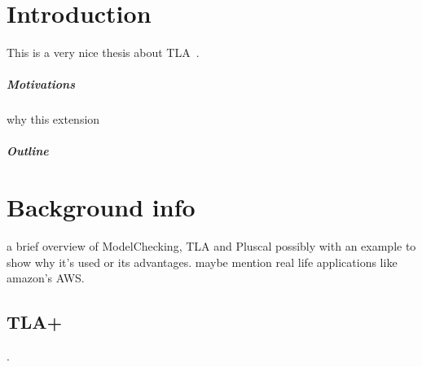 \documentclass{thesul}
\begin{document}

\WritePartLabelInToc
\WriteChapterLabelInToc


\tableofcontents

\NoChapterHead


\mainmatter


\chapter{Introduction}
This is a very nice thesis about TLA~\cite{tlabook}.

\paragraph*{Motivations}
why this extension

\paragraph*{Outline}


\chapter{Background info}

a brief overview of ModelChecking, TLA and Pluscal possibly with an example to show why it's used or its advantages.
maybe mention real life applications like amazon's AWS.


\section{TLA+}

\cite{tlabook}.
\end{document}
